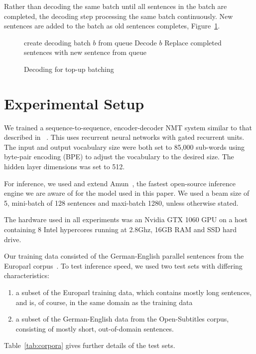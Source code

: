 \documentclass[11pt,a4paper]{article}
\begin{document}
Rather than decoding the same batch until all sentences in the batch are completed, the decoding step processing the same batch continuously. New sentences are added to the batch as old sentences completes, Figure~\ref{algo:Decoding for top-up batching}.

\begin{figure} [h]
\begin{algorithmic}
\STATE create decoding batch $b$ from queue
  \STATE Decode $b$
  \STATE Replace completed sentences with new sentence from queue
\ENDWHILE 
\end{algorithmic}
\caption{Decoding for top-up batching}
\label{algo:Decoding for top-up batching}
\end{figure}


\section{Experimental Setup}
\label{sec:Experimental Setup}

We trained a sequence-to-sequence, encoder-decoder NMT system similar to that described in ~\cite{sennrich-haddow-birch:2016:P16-12}. This uses recurrent neural networks with gated recurrent units. The input and output vocabulary size were both set to 85,000 sub-words using byte-pair encoding (BPE) to adjust the vocabulary to the desired size. The hidden layer dimensions was set to 512. %

For inference, we used and extend Amun~\citep{junczys2016neural}, the fastest open-source inference engine we are aware of for the model used in this paper. We used a beam size of 5, mini-batch of 128 sentences and maxi-batch 1280, unless otherwise stated.

The hardware used in all experiments was an Nvidia GTX 1060 GPU on a host containing 8 Intel hypercores running at 2.8Ghz, 16GB RAM and SSD hard drive.

Our training data consisted of the German-English parallel sentences from the Europarl corpus~\citep{Koehn:2005:MTS}. To test inference speed, we used two test sets with differing characteristics:
\begin{enumerate}
   \item \vspace{-2 mm} a subset of the Europarl training data, which contains mostly long sentences, and is, of course, in the same domain as the training data
   \item \vspace{-2 mm} a subset of the German-English data from the Open-Subtitles corpus, consisting of mostly short, out-of-domain sentences.
\end{enumerate}
Table~\ref{tab:corpora} gives further details of the test sets.
\end{document}
